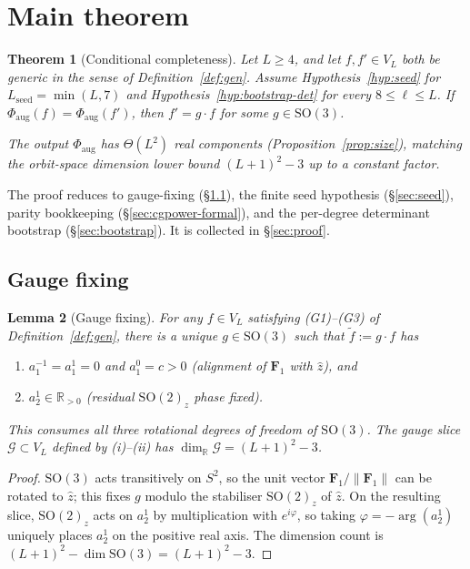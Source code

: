 \documentclass[11pt]{article}
\theoremstyle{plain}
\newtheorem{theorem}{Theorem}
\newtheorem{lemma}[theorem]{Lemma}
\theoremstyle{definition}
\theoremstyle{remark}
\newcommand{\R}{\mathbb{R}}
\newcommand{\SO}{\mathrm{SO}}
\newcommand{\norm}[1]{\lVert #1 \rVert}
\newcommand{\Phiaug}{\Phi_{\mathrm{aug}}}
\begin{document}
\section{Main theorem}
\label{sec:main}

\begin{theorem}[Conditional completeness]\label{thm:main}
Let $L \ge 4$, and let $f,f'\in V_L$ both be generic in the sense of
Definition~\ref{def:gen}. Assume Hypothesis~\ref{hyp:seed} for
$L_{\mathrm{seed}}=\min(L,7)$ and
Hypothesis~\ref{hyp:bootstrap-det} for every $8\le\ell\le L$. If
$\Phiaug(f)=\Phiaug(f')$, then $f'=g\cdot f$ for some $g\in\SO(3)$.

The output $\Phiaug$ has $\Theta(L^2)$ real components
(Proposition~\ref{prop:size}), matching the orbit-space
dimension lower bound $(L+1)^2 - 3$ up to a constant factor.
\end{theorem}

\noindent
The proof reduces to gauge-fixing (\S\ref{sec:gauge}), the finite
seed hypothesis (\S\ref{sec:seed}), parity bookkeeping
(\S\ref{sec:cgpower-formal}), and the per-degree determinant bootstrap
(\S\ref{sec:bootstrap}). It is collected in \S\ref{sec:proof}.

\subsection{Gauge fixing}
\label{sec:gauge}

\begin{lemma}[Gauge fixing]\label{lem:gauge}
For any $f \in V_L$ satisfying (G1)--(G3) of Definition~\ref{def:gen},
there is a unique $g \in \SO(3)$ such that $\tilde f := g\cdot f$ has
\begin{enumerate}[nosep,label=(\roman*)]
  \item $a_1^{-1} = a_1^1 = 0$ and $a_1^0 = c > 0$
    (alignment of $\mathbf{F}_1$ with $\hat z$), and
  \item $a_2^1 \in \R_{>0}$ (residual $\SO(2)_z$ phase fixed).
\end{enumerate}
This consumes all three rotational degrees of freedom of $\SO(3)$. The
\emph{gauge slice} $\mathcal{G}\subset V_L$ defined by (i)--(ii) has
$\dim_\R\mathcal{G} = (L+1)^2 - 3$.
\end{lemma}
\begin{proof}
$\SO(3)$ acts transitively on $S^2$, so the unit vector
$\mathbf{F}_1/\norm{\mathbf{F}_1}$ can be rotated to $\hat z$; this fixes
$g$ modulo the stabiliser $\SO(2)_z$ of $\hat z$. On the resulting
slice, $\SO(2)_z$ acts on $a_2^1$ by multiplication with $e^{i\varphi}$,
so taking $\varphi = -\arg(a_2^1)$ uniquely places $a_2^1$ on the
positive real axis. The dimension count is
$(L+1)^2 - \dim\SO(3) = (L+1)^2 - 3$.
\end{proof}
\end{document}
